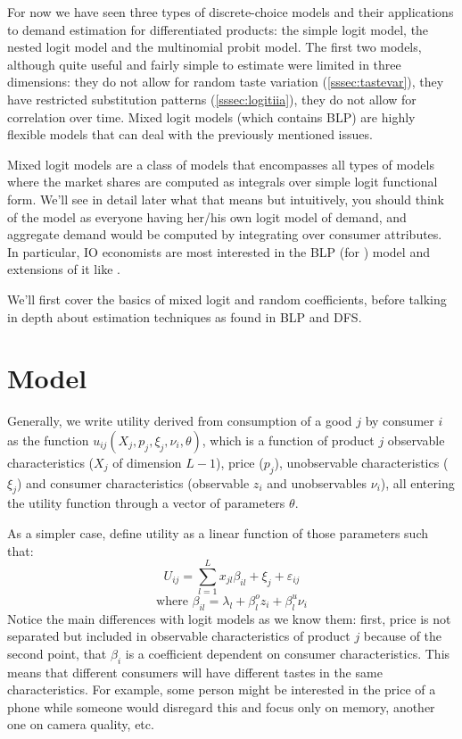 For now we have seen three types of discrete-choice models and their applications to demand estimation for differentiated products: the simple logit model, the nested logit model and the multinomial probit model. The first two models, although quite useful and fairly simple to estimate were limited in three dimensions: they do not allow for random taste variation (\ref{sssec:tastevar}), they have restricted substitution patterns (\ref{sssec:logitiia}),  they do not allow for correlation over time. Mixed logit models (which contains BLP) are highly flexible models that can deal with the previously mentioned issues.

Mixed logit models are a class of models that encompasses all types of models where the market shares are computed as integrals over simple logit functional form. We'll see in detail later what that means but intuitively, you should think of the model as everyone having her/his own logit model of demand, and aggregate demand would be computed by integrating over consumer attributes. In particular, IO economists are most interested in the BLP (for \cite{blp_95}) model and extensions of it like \cite{dfs_12}.

We'll first cover the basics of mixed logit and random coefficients, before talking in depth about estimation techniques as found in BLP and DFS.

\section{Model}

Generally, we write utility derived from consumption of a good $j$ by consumer $i$ as the function $u_{ij}(X_j, p_j, \xi_j, \nu_i, \theta)$, which is a function of product $j$ observable characteristics ($X_j$ of dimension $L-1$), price ($p_j$), unobservable characteristics ($\xi_j$) and consumer characteristics (observable $z_i$ and unobservables $\nu_i$), all entering the utility function through a vector of parameters $\theta$. 

As a simpler case, define utility as a linear function of those parameters such that: $$U_{ij} = \sum_{l=1}^L x_{jl}\beta_{il} + \xi_j + \varepsilon_{ij} $$ $$ \text{where } \beta_{il} = \lambda_l + \beta_l^o z_i + \beta_l^u \nu_i $$  Notice the main differences with logit models as we know them: first, price is not separated but included in observable characteristics of product $j$ because of the second point, that $\beta_i$ is a coefficient dependent on consumer characteristics. This means that different consumers will have different tastes in the same characteristics. For example, some person might be interested in the price of a phone while someone would disregard this and focus only on memory, another one on camera quality, etc.

